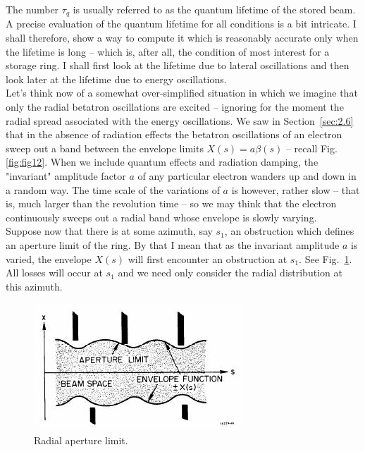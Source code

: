The number $\tau_q$ is usually referred to as the quantum lifetime of the stored beam.\\
A precise evaluation of the quantum lifetime for all conditions is a bit intricate. I shall therefore, show a way to compute it which is reasonably accurate only when the lifetime is long -- which is, after all, the condition of most interest for a storage ring. I shall first look at the lifetime due to lateral oscillations and then look later at the lifetime due to energy oscillations.\\
Let's think now of a somewhat over-simplified situation in which we imagine that only the radial betatron oscillations are excited -- ignoring for the moment the radial spread associated with the energy oscillations. We saw in Section~\ref{sec:2.6} that in the absence of radiation effects the betatron oscillations of an electron sweep out a band between the envelope limits
 $X(s) = a\beta(s)$ -- recall Fig.\ref{fig:fig12}. When we include quantum effects and radiation
 damping, the "invariant" amplitude factor $a$ of any particular electron wanders up and down in a random way. The time scale of the variations of $a$ is however, rather slow -- that is, much
larger than the revolution time -- so we may think that the electron continuously sweeps out a radial band whose envelope is slowly varying.\\
Suppose now that there is at some azimuth, say $s_1$, an obstruction which defines an aperture
 limit of the ring. By that I mean that as the invariant amplitude $a$ is varied, the envelope $X(s)$ will first encounter an obstruction at $s_1$. See Fig.~\ref{fig:fig46}. All losses will occur at $s_1$ and we need only consider the radial distribution at this azimuth.
\begin{figure}[!htb]
	\centering
	\includegraphics[width=0.8\linewidth]{./Figuras/fig46.jpeg}
	\caption{Radial aperture limit.}
	\label{fig:fig46}
\end{figure}

